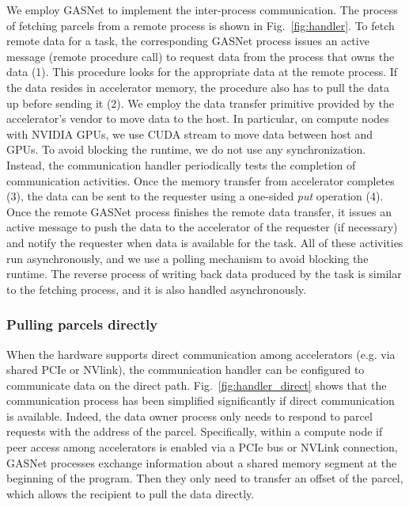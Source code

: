 We employ GASNet to implement the inter-process communication.
The process of fetching parcels from a remote process is shown in Fig.~\ref{fig:handler}.
To fetch remote data for a task, the corresponding GASNet process issues an active message (remote procedure call) to request data from the process that owns the data (1).
This procedure looks for the appropriate data at the remote process.
If the data resides in accelerator memory, the procedure also has to pull the data up before sending it (2).
We employ the data transfer primitive provided by the accelerator's vendor to move data to the host.
In particular, on compute nodes with NVIDIA GPUs, we use CUDA stream to move data between host and GPUs.
To avoid blocking the runtime, we do not use any synchronization.
Instead, the communication handler periodically tests the completion of communication activities.
Once the memory transfer from accelerator completes (3), the data can be sent to the requester using a one-sided {\em put} operation (4).
Once the remote GASNet process finishes the remote data transfer, it issues an active message to push the data to the accelerator of the requester (if necessary) and notify the requester when data is available for the task.
All of these activities run asynchronously, and we use a polling mechanism to avoid blocking the runtime.
The reverse process of writing back data produced by the task is similar to the fetching process, and it is also handled asynchronously.



\subsubsection{Pulling parcels directly}
When the hardware supports direct communication among accelerators (e.g. via shared PCIe or NVlink), the communication handler can be configured to communicate data on the direct path.
Fig.~\ref{fig:handler_direct} shows that the communication process has been simplified significantly if direct communication is available.
Indeed, the data owner process only needs to respond to parcel requests with the address of the parcel.
Specifically, within a compute node if peer access among accelerators is enabled via a PCIe bus or NVLink connection, GASNet processes exchange information about a shared memory segment at the beginning of the program.
Then they only need to transfer an offset of the parcel, which allows the recipient to pull the data directly.


